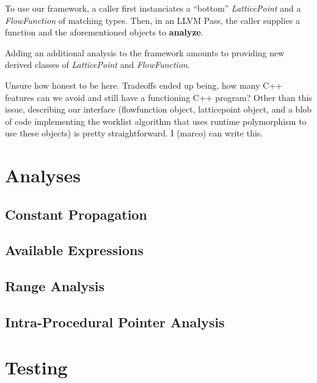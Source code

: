 \documentclass{article}
\theoremstyle{definition}
\begin{document}
To use our framework, a caller  first instanciates a ``bottom''
\emph{LatticePoint} and a \emph{FlowFunction} of matching types. Then,
in an LLVM Pass, the caller supplies a function and the aforementioned
objects to \textbf{analyze}. 

Adding an additional analysis to the framework amounts to providing
new derived classes of \emph{LatticePoint} and \emph{FlowFunction}.


Unsure how honest to be here. Tradeoffs ended up being, how many C++
features can we avoid and still have a functioning C++ program? Other
than this issue, describing our interface (flowfunction object,
latticepoint object, and a blob of code implementing the worklist
algorithm that uses runtime polymorphism to use these objects) is
pretty straightforward. I (marco) can write this.

\section{Analyses}

\subsection{Constant Propagation}


\subsection{Available Expressions}


\subsection{Range Analysis}



\subsection{Intra-Procedural Pointer Analysis}













\section{Testing}
\end{document}
